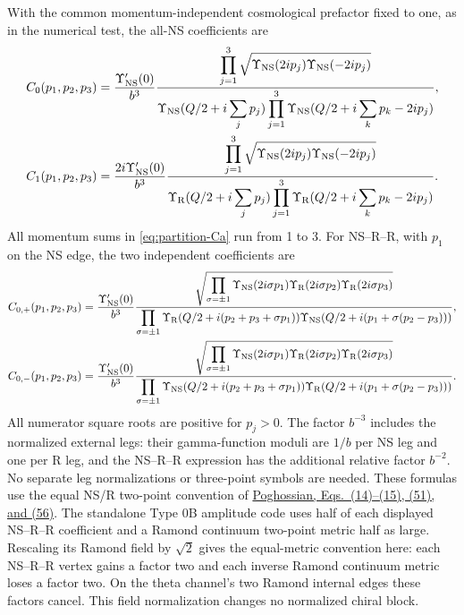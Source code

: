 With the common momentum-independent cosmological prefactor
fixed to one, as in the numerical test, the all-NS coefficients are
\begin{align}
 C_0(p_1,p_2,p_3)
 &=\frac{\Upsilon'_{\mathrm{NS}}(0)}{b^3}
 \frac{\displaystyle\prod_{j=1}^3
       \sqrt{\Upsilon_{\mathrm{NS}}(2ip_j)\Upsilon_{\mathrm{NS}}(-2ip_j)}}
 {\displaystyle\Upsilon_{\mathrm{NS}}(Q/2+i\sum_jp_j)
       \prod_{j=1}^3\Upsilon_{\mathrm{NS}}(Q/2+i\sum_kp_k-2ip_j)},\nonumber\\
 C_1(p_1,p_2,p_3)
 &=\frac{2i\Upsilon'_{\mathrm{NS}}(0)}{b^3}
 \frac{\displaystyle\prod_{j=1}^3
       \sqrt{\Upsilon_{\mathrm{NS}}(2ip_j)\Upsilon_{\mathrm{NS}}(-2ip_j)}}
 {\displaystyle\Upsilon_{\mathrm R}(Q/2+i\sum_jp_j)
       \prod_{j=1}^3\Upsilon_{\mathrm R}(Q/2+i\sum_kp_k-2ip_j)}.
 \label{eq:partition-Ca}
\end{align}
All momentum sums in \eqref{eq:partition-Ca} run from 1 to 3.
For NS--R--R, with $p_1$ on the NS edge, the two independent
coefficients are
\begin{align}
 C_{0,+}(p_1,p_2,p_3)
 &=\frac{\Upsilon'_{\mathrm{NS}}(0)}{b^3}
 \frac{\displaystyle\sqrt{\prod_{\sigma=\pm1}
     \Upsilon_{\mathrm{NS}}(2i\sigma p_1)
     \Upsilon_{\mathrm R}(2i\sigma p_2)\Upsilon_{\mathrm R}(2i\sigma p_3)}}
 {\displaystyle\prod_{\sigma=\pm1}
     \Upsilon_{\mathrm R}(Q/2+i(p_2+p_3+\sigma p_1))
     \Upsilon_{\mathrm{NS}}(Q/2+i(p_1+\sigma(p_2-p_3)))},\nonumber\\
 C_{0,-}(p_1,p_2,p_3)
 &=\frac{\Upsilon'_{\mathrm{NS}}(0)}{b^3}
 \frac{\displaystyle\sqrt{\prod_{\sigma=\pm1}
     \Upsilon_{\mathrm{NS}}(2i\sigma p_1)
     \Upsilon_{\mathrm R}(2i\sigma p_2)\Upsilon_{\mathrm R}(2i\sigma p_3)}}
 {\displaystyle\prod_{\sigma=\pm1}
     \Upsilon_{\mathrm{NS}}(Q/2+i(p_2+p_3+\sigma p_1))
     \Upsilon_{\mathrm R}(Q/2+i(p_1+\sigma(p_2-p_3)))}.
 \label{eq:partition-Cfeta}
\end{align}
All numerator square roots are positive for
$p_j>0$. The factor $b^{-3}$ includes the
normalized external legs: their gamma-function moduli are $1/b$
per NS leg and one per R leg, and the NS--R--R expression has
the additional relative factor $b^{-2}$. No separate leg
normalizations or three-point symbols are needed.
These formulas use the equal NS/R two-point convention of
\href{https://arxiv.org/pdf/hep-th/9607120}{Poghossian,
Eqs.~(14)--(15), (51), and (56)}.
The standalone Type 0B amplitude code uses half of each displayed
NS--R--R coefficient and a Ramond continuum two-point metric half as
large. Rescaling its Ramond field by $\sqrt2$ gives the equal-metric
convention here: each NS--R--R vertex gains a factor two and each
inverse Ramond continuum metric loses a factor two. On the theta
channel's two Ramond internal edges these factors cancel. This field
normalization changes no normalized chiral block.


